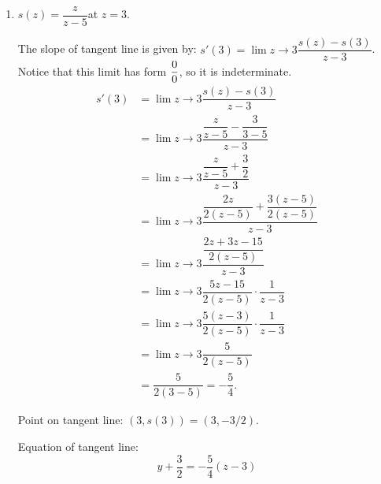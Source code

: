 \documentclass{ximera}
\begin{document}
\begin{problem}
\begin{enumerate}
    \item
      $\displaystyle s(z) = \dfrac{z}{z-5}$\quad at $z = 3$.
      \begin{explanation}
        The slope of tangent line is given by: $\displaystyle  s'(3) = \displaystyle \lim{z \to 3} \dfrac{s(z) - s(3)}{z-3} $. Notice that this limit has form $\dfrac{0}{0}$, so it is indeterminate. 
        \begin{align*}
       s'(3) &= \displaystyle \lim{z \to 3} \dfrac{s(z) - s(3)}{z-3}  \\
		&= \displaystyle \lim{z \to 3} \dfrac{\dfrac{z}{z-5} - \dfrac{3}{3-5}}{z-3}  \\
		&= \displaystyle \lim{z \to 3} \dfrac{\dfrac{z}{z-5} + \dfrac{3}{2}}{z-3}  \\
		&= \displaystyle \lim{z \to 3} \dfrac{\dfrac{2z}{2(z-5)} + \dfrac{3(z-5)}{2(z-5)}}{z-3}  \\
		&= \displaystyle \lim{z \to 3} \dfrac{\dfrac{2z + 3z - 15}{2(z-5)}}{z-3}  \\
		&= \displaystyle \lim{z \to 3} \dfrac{5z-15}{2(z-5)} \cdot \dfrac{1}{z-3}  \\
		&= \displaystyle \lim{z \to 3} \dfrac{5(z-3)}{2(z-5)} \cdot \dfrac{1}{z-3}  \\
		&= \displaystyle \lim{z \to 3} \dfrac{5}{2(z-5)}  \\
		&= \dfrac{5}{2(3-5)} = -\dfrac{5}{4}.
	\end{align*}

        Point on tangent line: $(3, s(3)) = (3, -3/2)$.

        Equation of tangent line:
	\[ y + \dfrac{3}{2} = -\dfrac{5}{4}(z - 3) \]
      \end{explanation}
  \end{enumerate}
\end{problem}
\end{document}
